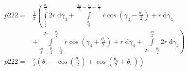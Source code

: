 \begin{align}
    p222 =&\frac{1}{\pi} \left(\int\limits_{\frac{\pi}{2}}^{\frac{\theta_{s}}{2}}2 r\;\mathrm{d}\gamma_{4}+\int\limits_{\frac{\theta_{s}}{2}}^{\frac{5 \pi}{2} - \frac{\theta_{s}}{2} - \frac{\theta_{a}}{2}}r \cos{\left (\gamma_{4} - \frac{\theta_{s}}{2} \right )} + r\;\mathrm{d}\gamma_{4}\right.\\
 &\left.+\int\limits_{\frac{5 \pi}{2} - \frac{\theta_{s}}{2} - \frac{\theta_{a}}{2}}^{2 \pi - \frac{\theta_{s}}{2}}r \cos{\left (\gamma_{4} + \frac{\theta_{s}}{2} \right )} + r\;\mathrm{d}\gamma_{4}+\int\limits_{2 \pi - \frac{\theta_{s}}{2}}^{\frac{3 \pi}{2}}2 r\;\mathrm{d}\gamma_{4}\right)\\
    p222 =& \frac{r}{\pi} \left(\theta_{s} - \cos{\left (\frac{\theta_{a}}{2} \right )} + \cos{\left (\frac{\theta_{a}}{2} + \theta_{s} \right )}\right)
\end{align}